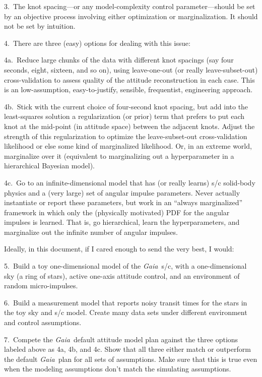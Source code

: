 \documentclass[12pt]{article}
\newcommand{\project}[1]{\textsl{#1}}
\newcommand{\gaia}{\project{Gaia}}
\begin{document}
3.~The knot spacing---or any model-complexity control
parameter---should be set by an objective process involving either
optimization or marginalization.  It should not be set by intuition.

4.~There are three (easy) options for dealing with this issue:

4a.~Reduce large chunks of the data with different knot spacings (say
four seconds, eight, sixteen, and so on), using leave-one-out (or
really leave-subset-out) cross-validation to assess quality of the
attitude reconstruction in each case.  This is an low-assumption,
easy-to-justify, sensible, frequentist, engineering approach.

4b.~Stick with the current choice of four-second knot spacing, but add
into the least-squares solution a regularization (or prior) term that
prefers to put each knot at the mid-point (in attitude space) between
the adjacent knots.  Adjust the strength of this regularization to
optimize the leave-subset-out cross-validation likelihood or else some
kind of marginalized likelihood.  Or, in an extreme world, marginalize
over it (equivalent to marginalizing out a hyperparameter in a
hierarchical Bayesian model).

4c.~Go to an infinite-dimensional model that has (or really learns)
s/c solid-body physics and a (very large) set of angular impulse
parameters.  Never actually instantiate or report these parameters,
but work in an ``always marginalized'' framework in which only the
(physically motivated) PDF for the angular impulses is learned.  That
is, go hierarchical, learn the hyperparameters, and marginalize out
the infinite number of angular impulses.

Ideally, in this document, if I cared enough to send the very best, I
would:

5.~Build a toy one-dimensional model of the \gaia\ s/c, with a
one-dimensional sky (a ring of stars), active one-axis attitude
control, and an environment of random micro-impulses.

6.~Build a measurement model that reports noisy transit times for the
stars in the toy sky and s/c model.  Create many data sets under
different environment and control assumptions.

7.~Compete the \gaia\ default attitude model plan against the three
options labeled above as 4a, 4b, and 4c.  Show that all three either
match or outperform the default \gaia\ plan for all sets of
assumptions.  Make sure that this is true even when the modeling
assumptions don't match the simulating assumptions.
\end{document}
